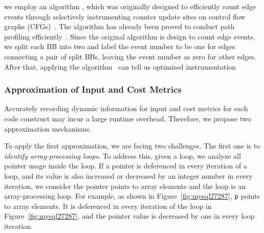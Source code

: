 we employ an algorithm , 
which was originally designed to efficiently 
count edge events through selectively instrumenting counter update sites 
on control flow graphs (CFGs)~\cite{event-counting}.
The algorithm has already been proved to conduct path 
profiling efficiently~\cite{path-profiling,peter-ase}.  
Since the original algorithm is design to count edge events, 
we split each BB into two and label the event number to be one for 
edges connecting a pair of split BBs, 
leaving the event number as zero for other edges. 
After that, applying the algorithm~\cite{event-counting}
can tell us optimized instrumentation  


\subsubsection{Approximation of Input and Cost Metrics}


Accurately recording dynamic information for input and cost metrics
for each code construct
may incur a large runtime overhead.
Therefore, we propose two approximation mechanisms. 

To apply the first approximation, we are facing two challenges. 
The first one is to \emph{identify array-processing loops}.
To address this, given a loop, we analyze all pointer usage inside the loop. 
If a pointer is deferenced in every iteration of a loop, 
and its value is also increased or decreased by 
an integer number in every iteration,
we consider the pointer points to array elements and 
the loop is an array-processing loop.  
For example, as shown in Figure~\ref{fig:mysql27287}, 
\texttt{p} points to array elements. 
It is deferenced in every iteration of the loop 
in Figure~\ref{fig:mysql27287},
and the pointer value is decreased by one in every loop iteration. 


